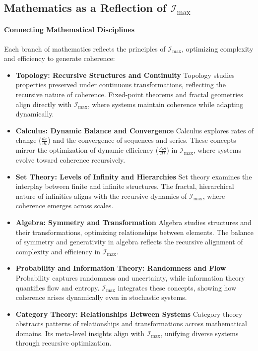 \documentclass[12pt]{article}
\begin{document}
\subsection{Mathematics as a Reflection of \(\mathcal{I}_{\text{max}}\)}

\paragraph{Connecting Mathematical Disciplines}
Each branch of mathematics reflects the principles of \(\mathcal{I}_{\text{max}}\), optimizing complexity and efficiency to generate coherence:
\begin{itemize}
    \item \textbf{Topology: Recursive Structures and Continuity}  
    Topology studies properties preserved under continuous transformations, reflecting the recursive nature of coherence. Fixed-point theorems and fractal geometries align directly with \(\mathcal{I}_{\text{max}}\), where systems maintain coherence while adapting dynamically.
    
    \item \textbf{Calculus: Dynamic Balance and Convergence}  
    Calculus explores rates of change (\(\frac{dx}{dt}\)) and the convergence of sequences and series. These concepts mirror the optimization of dynamic efficiency (\(\frac{\Delta S}{\Delta t}\)) in \(\mathcal{I}_{\text{max}}\), where systems evolve toward coherence recursively.

    \item \textbf{Set Theory: Levels of Infinity and Hierarchies}  
    Set theory examines the interplay between finite and infinite structures. The fractal, hierarchical nature of infinities aligns with the recursive dynamics of \(\mathcal{I}_{\text{max}}\), where coherence emerges across scales.

    \item \textbf{Algebra: Symmetry and Transformation}  
    Algebra studies structures and their transformations, optimizing relationships between elements. The balance of symmetry and generativity in algebra reflects the recursive alignment of complexity and efficiency in \(\mathcal{I}_{\text{max}}\).

    \item \textbf{Probability and Information Theory: Randomness and Flow}  
    Probability captures randomness and uncertainty, while information theory quantifies flow and entropy. \(\mathcal{I}_{\text{max}}\) integrates these concepts, showing how coherence arises dynamically even in stochastic systems.

    \item \textbf{Category Theory: Relationships Between Systems}  
    Category theory abstracts patterns of relationships and transformations across mathematical domains. Its meta-level insights align with \(\mathcal{I}_{\text{max}}\), unifying diverse systems through recursive optimization.
\end{itemize}
\end{document}
